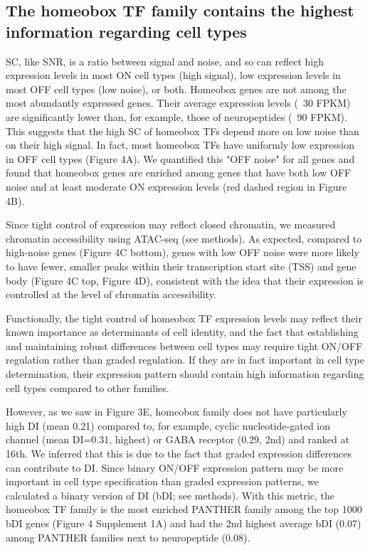 \subsection{The homeobox TF family contains the highest information regarding cell types}

SC, like SNR, is a ratio between signal and noise, and so can reflect high expression levels in most ON cell types (high signal), low expression levels in most OFF cell types (low noise), or both. Homeobox genes are not among the most abundantly expressed genes. Their average expression levels (~30 FPKM) are significantly lower than, for example, those of neuropeptides (~90 FPKM). This suggests that the high SC of homeobox TFs depend more on low noise than on their high signal. In fact, most  homeobox TFs have uniformly low expression in OFF cell types (Figure 4A). We quantified this "OFF noise" for all genes and found that homeobox genes are enriched among genes that have both low OFF noise and at least moderate ON expression levels (red dashed region in Figure 4B).

Since tight control of expression may reflect closed chromatin, we measured chromatin accessibility using ATAC-seq (see methods). As expected, compared to high-noise genes (Figure 4C bottom), genes with low OFF noise were more likely to have fewer, smaller peaks within their transcription start site (TSS) and gene body (Figure 4C top, Figure 4D), consistent with the idea that their expression is controlled at the level of chromatin accessibility.

Functionally, the tight control of homeobox TF expression levels may reflect their known importance as determinants of cell identity, and the fact that establishing and maintaining robust differences between cell types may require tight ON/OFF regulation rather than graded regulation. If they are in fact important in cell type determination, their expression pattern should contain high information regarding cell types compared to other families. 

However, as we saw in Figure 3E, homeobox family does not have particularly high DI (mean 0.21) compared to, for example, cyclic nucleotide-gated ion channel (mean DI=0.31, highest) or GABA receptor (0.29, 2nd) and ranked at 16th. We inferred that this is due to the fact that graded expression differences can contribute to DI. Since binary ON/OFF expression pattern may be more important in cell type specification than graded expression patterns, we calculated a binary version of DI (bDI; see methods). With this metric, the homeobox TF family is the most enriched PANTHER family among the top 1000 bDI genes (Figure 4 Supplement 1A) and had the 2nd highest average bDI (0.07) among PANTHER families next to neuropeptide (0.08).

